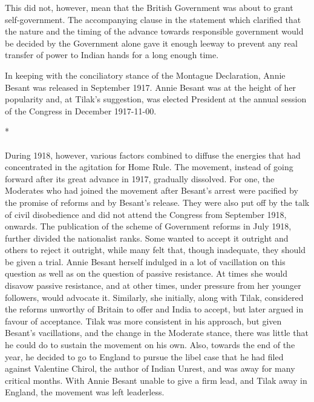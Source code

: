 \begin{multicols}{2}
This did not, however, mean that the British Government was about to grant self-government. The accompanying clause in the statement which clarified that the nature and the timing of the advance towards responsible government would be decided by the Government alone gave it enough leeway to prevent any real transfer of power to Indian hands for a long enough time.

In keeping with the conciliatory stance of the Montague Declaration, Annie Besant was released in September 1917. Annie Besant was at the height of her popularity and, at Tilak's suggestion, was elected President at the annual session of the Congress in December 1917-11-00.

\begin{center}*\end{center}

\paragraph*{}

During 1918, however, various factors combined to diffuse the energies that had concentrated in the agitation for Home Rule. The movement, instead of going forward after its great advance in 1917, gradually dissolved. For one, the Moderates who had joined the movement after Besant's arrest were pacified by the promise of reforms and by Besant's release. They were also put off by the talk of civil disobedience and did not attend the Congress from September 1918, onwards. The publication of the scheme of Government reforms in July 1918, further divided the nationalist ranks. Some wanted to accept it outright and others to reject it outright, while many felt that, though inadequate, they should be given a trial. Annie Besant herself indulged in a lot of vacillation on this question as well as on the question of passive resistance. At times she would disavow passive resistance, and at other times, under pressure from her younger followers, would advocate it. Similarly, she initially, along with Tilak, considered the reforms unworthy of Britain to offer and India to accept, but later argued in favour of acceptance. Tilak was more consistent in his approach, but given Besant's vacillations, and the change in the Moderate stance, there was little that he could do to sustain the movement on his own. Also, towards the end of the year, he decided to go to England to pursue the libel case that he had filed against Valentine Chirol, the author of Indian Unrest, and was away for many critical months. With Annie Besant unable to give a firm lead, and Tilak away in England, the movement was left leaderless.


\end{multicols}
